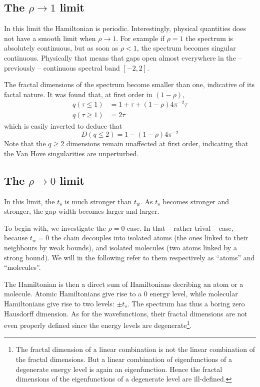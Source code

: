\documentclass[11pt]{article}
\numberwithin{equation}{section}
\begin{document}
\subsection{The $\rho \rightarrow 1$ limit}

In this limit the Hamiltonian is periodic. Interestingly, physical quantities does not have a smooth limit when $\rho \rightarrow 1$. 
For example if $\rho = 1$ the spectrum is absolutely continuous, but as soon as $\rho < 1$, the spectrum becomes singular continuous. Physically that means that gaps open almost everywhere in the -- previously -- continuous spectral band $[-2,2]$.

The fractal dimensions of the spectrum become smaller than one, indicative of its factal nature.
It was found \cite{Rudinger1996} that, at first order in $(1-\rho)$,
\begin{align}
	q(\tau \leq 1) &= 1+\tau + (1-\rho)4 \pi^{-2} \tau \\
	q(\tau \geq 1) &= 2 \tau
\end{align}
which is easily inverted to deduce that
\begin{equation}
	D(q \leq 2) = 1 - (1-\rho)4 \pi^{-2}
\end{equation}
Note that the $q \geq 2$ dimensions remain unaffected at first order, indicating that the Van Hove singularities are unperturbed.

\subsection{The $\rho \rightarrow 0$ limit}

In this limit, the $t_s$ is much stronger than $t_w$.
As $t_s$ becomes stronger and stronger, the gap width becomes larger and larger. 

To begin with, we investigate the $\rho = 0$ case. 
In that -- rather trival -- case, because $t_w = 0$ the chain decouples into isolated atoms (the ones linked to their neighbours by weak bounds), and isolated molecules (two atoms linked by a strong bound). We will in the following refer to them respectively as ``atoms'' and ``molecules''.

The Hamiltonian is then a direct sum of Hamiltonians decribing an atom or a molecule. Atomic Hamiltonians give rise to a $0$ energy level, while molecular Hamiltonians give rise to two levels: $\pm t_s$.
The spectrum has thus a boring zero Hausdorff dimension. As for the wavefunctions, their fractal dimensions are not even properly defined since the energy levels are degenerate\footnote{The fractal dimension of a linear combination is not the linear combination of the fractal dimensions. But a linear combination of eigenfunctions of a degenerate energy level is again an eigenfunction. Hence the fractal dimensions of the eigenfunctions of a degenerate level are ill-defined.}.
\end{document}
